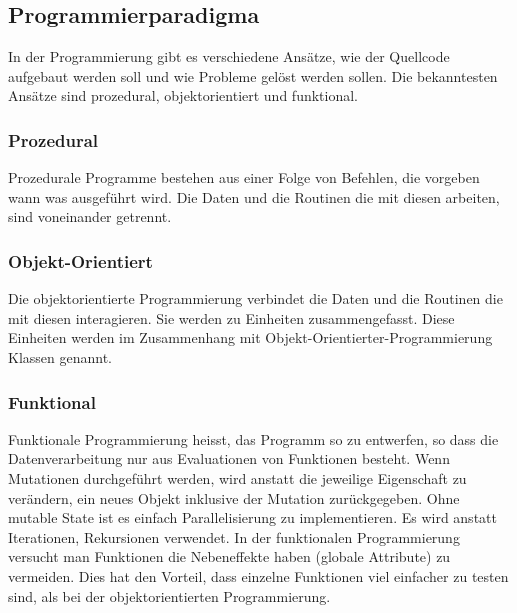     \subsection{Programmierparadigma\label{sub:TechnologyParadigma}}

      In der Programmierung gibt es verschiedene Ansätze,
      wie der Quellcode aufgebaut werden soll und wie Probleme gelöst werden sollen.
      Die bekanntesten Ansätze sind prozedural, objektorientiert und funktional.

      \subsubsection{Prozedural\label{subsub:TechnologyParadigmaProzedural}}

        Prozedurale Programme bestehen aus einer Folge von Befehlen,
        die vorgeben wann was ausgeführt wird.
        Die Daten und die Routinen die mit diesen arbeiten, sind voneinander getrennt.

      \subsubsection{Objekt-Orientiert\label{subsub:TechnologyParadigmaObjectOriented}}

        Die objektorientierte Programmierung verbindet die Daten und
        die Routinen die mit diesen interagieren. Sie werden zu Einheiten zusammengefasst.
        Diese Einheiten werden im Zusammenhang mit Objekt-Orientierter-Programmierung Klassen genannt.

      \subsubsection{Funktional\label{subsub:TechnologyParadigmaFunctional}}

        Funktionale Programmierung heisst, das Programm so zu entwerfen, so dass die Datenverarbeitung nur aus Evaluationen von Funktionen besteht.
        Wenn Mutationen durchgeführt werden, wird anstatt die jeweilige Eigenschaft zu verändern,
        ein neues Objekt inklusive der Mutation zurückgegeben. Ohne mutable State ist es einfach Parallelisierung zu implementieren.
        Es wird anstatt Iterationen, Rekursionen verwendet.
        In der funktionalen Programmierung versucht man Funktionen die Nebeneffekte haben (globale Attribute) zu vermeiden.
        Dies hat den Vorteil, dass einzelne Funktionen viel einfacher zu testen sind, als bei der objektorientierten Programmierung.

